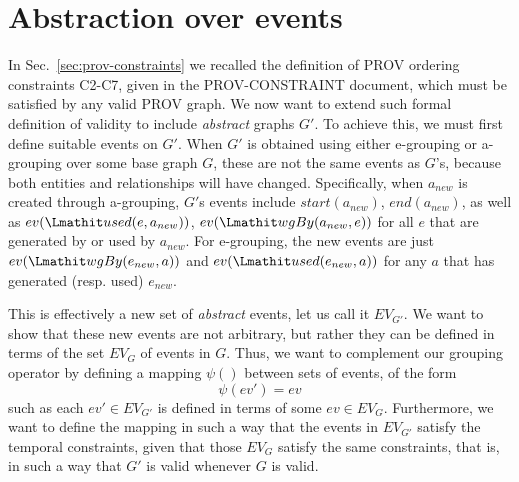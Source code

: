 
\section{Abstraction over events}
\label{sec:event}

In Sec.~\ref{sec:prov-constraints} we recalled the definition of PROV ordering  constraints C2-C7, given in the PROV-CONSTRAINT document, which must be satisfied by any valid PROV graph.
We now want to extend such formal definition of validity to include \textit{abstract} graphs $G'$. 
To achieve this, we must first define suitable events on $G'$. 
When $G'$ is obtained using either e-grouping or a-grouping over some base graph $G$,  these are not the same events as $G$'s, because both entities and relationships will have changed. 
Specifically, when $a_{new}$ is created through a-grouping, $G'$s events include 
 $start(a_{new})$, $end(a_{new})$, as well as 
$ev(\used(e, a_{new}))$, $ev(\wgby(a_{new}, e))$ for all $e$ that are generated by or used by $a_{new}$. 
For e-grouping, the new events are just $ev(\wgby(e_{new}, a))$ and  $ev(\used(e_{new},a))$ for any $a$ that has generated (resp. used) $e_{new}$.

This is effectively a new set of \textit{abstract} events, let us call it $EV_{G'}$. We want to show that these new events are not arbitrary, but rather they can be defined in terms of the set $EV_G$ of events in $G$.
Thus, we want to complement our grouping operator by defining a mapping $\psi()$ between sets of events, of the form
\[ \psi(ev') = ev \]
such as each $ev' \in EV_{G'}$ is defined in terms of some $ev \in EV_G$.
Furthermore, we want to define the mapping in such a way that the events in $EV_{G'}$ satisfy the temporal constraints, given that those $EV_G$ satisfy the same constraints, that is, in such a way that $G'$ is valid whenever $G$ is valid. 




